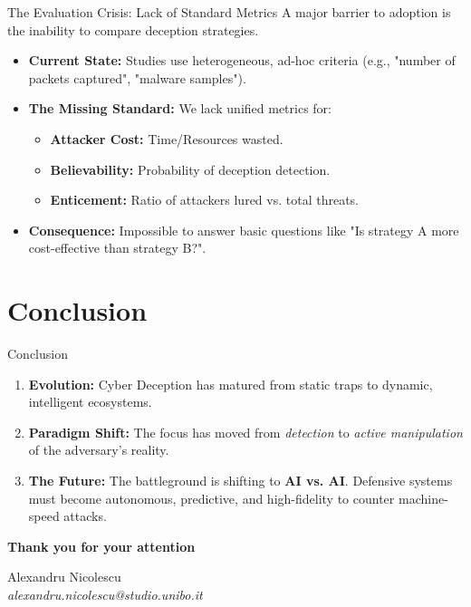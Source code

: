 \documentclass[12pt, aspectratio=169]{beamer}
\begin{document}
\begin{frame}{The Evaluation Crisis: Lack of Standard Metrics}
    A major barrier to adoption is the inability to compare deception strategies.

    \begin{itemize}
        \item \textbf{Current State:} Studies use heterogeneous, ad-hoc criteria (e.g., "number of packets captured", "malware samples").
        \item \textbf{The Missing Standard:} We lack unified metrics for:
              \begin{itemize}
                  \item \textbf{Attacker Cost:} Time/Resources wasted.
                  \item \textbf{Believability:} Probability of deception detection.
                  \item \textbf{Enticement:} Ratio of attackers lured vs. total threats.
              \end{itemize}
        \item \textbf{Consequence:} Impossible to answer basic questions like "Is strategy A more cost-effective than strategy B?".
    \end{itemize}
\end{frame}

\section{Conclusion}
\begin{frame}{Conclusion}
    \begin{enumerate}
        \item \textbf{Evolution:} Cyber Deception has matured from static traps to dynamic, intelligent ecosystems.
        \item \textbf{Paradigm Shift:} The focus has moved from \textit{detection} to \textit{active manipulation} of the adversary's reality.
        \item \textbf{The Future:} The battleground is shifting to \textbf{AI vs. AI}. Defensive systems must become autonomous, predictive, and high-fidelity to counter machine-speed attacks.
    \end{enumerate}

\end{frame}

\begin{frame}[plain]
    \centering
    \Huge \textbf{Thank you for your attention}

    \vspace{4cm}
    \normalsize
    Alexandru Nicolescu \\
    \textit{alexandru.nicolescu@studio.unibo.it}
\end{frame}
\end{document}
